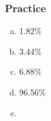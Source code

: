 
\begin{frame}
\frametitle{Practice}


\vspace{-0.5cm}
\begin{multicols}{2}
\begin{enumerate}[(a)]
\item 1.82\%
\item 3.44\%
\item 6.88\%
\item 96.56\%
\item[]
\end{enumerate}
\end{multicols}


\end{frame}
